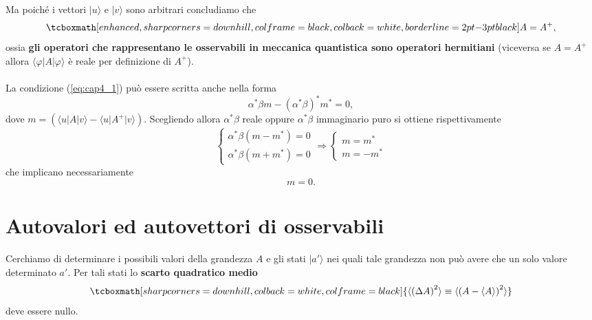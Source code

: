 \documentclass[a4paper,12pt,oneside]{book}
\begin{document}
Ma poiché i vettori $\vert u \rangle$ e $\vert v \rangle$ sono arbitrari concludiamo che
	\begin{equation}
		\tcboxmath[enhanced, sharp corners=downhill, colframe=black, colback=white, borderline={2pt}{-3pt}{black}]{
			A= A^{+},
			}
	\end{equation}
ossia \textbf{gli operatori che rappresentano le osservabili in meccanica quantistica sono operatori hermitiani} (viceversa se $A= A^{+}$ allora $\langle \varphi \vert A \vert \varphi \rangle$ è reale per definizione di $A^{+}$).\\ \\

La condizione (\ref{eq:cap4_1}) può essere scritta anche nella forma
	\begin{equation}
		\alpha ^* \beta m - \left( \alpha ^*  \beta \right) ^* m^* =0, 
	\end{equation}
dove $m= \left( \langle u \vert A \vert v \rangle - \langle u \vert A^{+} \vert v \rangle \right)$. Scegliendo allora $\alpha ^* \beta$ reale oppure $\alpha ^* \beta$ immaginario puro si ottiene rispettivamente
	\begin{equation}
		\begin{cases}
		\alpha ^* \beta \left( m- m^* \right) =0 \\
		\alpha ^* \beta \left( m + m^* \right) =0
		\end{cases}
		\Rightarrow
		\begin{cases}
		m= m^*\\
		m= - m^*
		\end{cases}
	\end{equation}
che implicano necessariamente
	\begin{equation}
		m=0.
	\end{equation}
\section{Autovalori ed autovettori di osservabili}
Cerchiamo di determinare i possibili valori della grandezza $A$ e gli stati $\vert a' \rangle$ nei quali tale grandezza non può avere che un solo valore determinato $a'$. Per tali stati lo \textbf{scarto quadratico medio} 	
	\begin{equation}
		\tcboxmath[sharp corners=downhill, colback=white, colframe=black]{
			\langle \left( \Delta A \right) ^2 \rangle \equiv \langle \left( A- \langle A\rangle \right) ^2 \rangle
			}
	\end{equation}
deve essere nullo.\\
\end{document}
